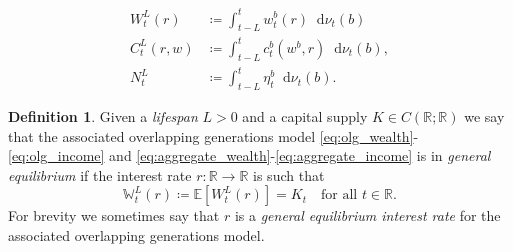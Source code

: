 \documentclass[10pt,a4paper]{amsart}
\theoremstyle{plain}
\theoremstyle{plain}
\theoremstyle{definition}
\newtheorem{defn}{Definition}
\theoremstyle{remark}
\newcommand{\RR}{\mathbb{R}}
\newcommand{\dd}{\mathop{}\!\mathrm{d}}
\newcommand{\mbE}{\mathbb{E}}
\newcommand{\mbR}{\mathbb{R}}
\newcommand{\mbW}{\mathbb{W}}
\begin{document}
\begin{align}
    W^L_t(r) &\coloneqq \int_{t-L}^{t} w_t^{b}(r) \dd \nu_t(b)\label{eq:aggregate_wealth}\\
    C^L_t(r,w) &\coloneqq \int_{t-L}^t c^{b}_t(w^b,r) \dd \nu_t(b) , \label{eq:aggregate_consumption} \\
    N^L_t &\coloneqq \int_{t-L}^t \eta^{b}_t \dd \nu_t(b). \label{eq:aggregate_income} 
\end{align}

\begin{defn}\label{def:olg_clearing_rate}
    Given a \emph{lifespan} $L>0$ and a capital supply $K\in C(\RR;\RR)$  we say that the associated overlapping generations model \eqref{eq:olg_wealth}-\eqref{eq:olg_income} and \eqref{eq:aggregate_wealth}-\eqref{eq:aggregate_income} is in \emph{general equilibrium} if the interest rate $r:\mbR\to \mbR$ is such that
    \begin{equation}\label{eq:olg_clearing}
        \mbW^L_t(r) \coloneqq \mbE\left[W^L_t(r)\right] = K_t \quad \text{for all}\,\, t\in \mbR.
        \end{equation}
        For brevity we sometimes say that $r$ is a \emph{general equilibrium interest rate} for the associated overlapping generations model.
\end{defn}
\end{document}
